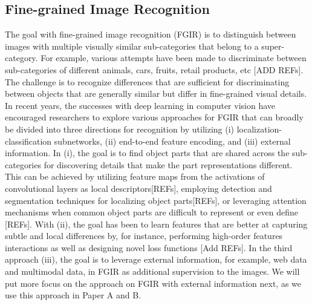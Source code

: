 \subsection{Fine-grained Image Recognition}
The goal with fine-grained image recognition (FGIR) is to distinguish between images with multiple visually similar sub-categories that belong to a super-category. For example, various attempts have been made to discriminate between sub-categories of different animals, cars, fruits, retail products, etc [ADD REFs]. The challenge is to recognize differences that are sufficient for discriminating between objects that are generally similar but differ in fine-grained visual details. In recent years, the successes with deep learning in computer vision have encouraged researchers to explore various approaches for FGIR that can broadly be divided into three directions for recognition by utilizing (i) localization-classification subnetworks, (ii) end-to-end feature encoding, and (iii) external information. In (i), the goal is to find object parts that are shared across the sub-categories for discovering details that make the part representations different. This can be achieved by utilizing feature maps from the activations of convolutional layers as local descriptors[REFs], employing detection and segmentation techniques for localizing object parts[REFs], or leveraging attention mechanisms when common object parts are difficult to represent or even define [REFs]. With (ii), the goal has been to learn features that are better at capturing subtle and local differences by, for instance, performing high-order features interactions as well as designing novel loss functions [Add REFs]. In the third approach (iii), the goal is to leverage external information, for example, web data and multimodal data, in FGIR as additional supervision to the images. We will put more focus on the approach on FGIR with external information next, as we use this approach in Paper A and B. 

